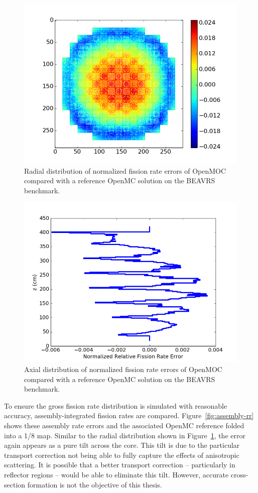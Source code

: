 \begin{figure}[ht!]
	\centering
	\includegraphics[width=0.6\linewidth]{figures/results/full-core/radial_diff_v_openmc.png}
	\caption{Radial distribution of normalized fission rate errors of OpenMOC compared with a reference OpenMC solution on the BEAVRS benchmark.}
	\label{fig:openmc-comp-rad}
\end{figure}

\begin{figure}[ht!]
	\centering
	\includegraphics[width=0.6\linewidth]{figures/results/full-core/axial_diff_v_openmc.png}
	\caption{Axial distribution of normalized fission rate errors of OpenMOC compared with a reference OpenMC solution on the BEAVRS benchmark.}
	\label{fig:openmc-comp-ax}
\end{figure}


To ensure the gross fission rate distribution is simulated with reasonable accuracy, assembly-integrated fission rates are compared. Figure~\ref{fig:assembly-rr} shows these assembly rate errors and the associated OpenMC reference folded into a 1/8 map. Similar to the radial distribution shown in Figure~\ref{fig:openmc-comp-rad}, the error again appears as a pure tilt across the core. This tilt is due to the particular transport correction not being able to fully capture the effects of anisotropic scattering. It is possible that a better transport correction -- particularly in reflector regions -- would be able to eliminate this tilt. However, accurate cross-section formation is not the objective of this thesis.

